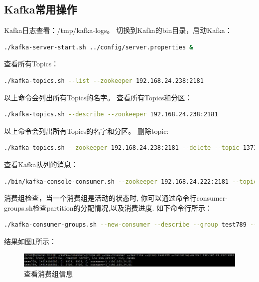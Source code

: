 \documentclass{book}
\begin{document}
\subsection{Kafka常用操作}

Kafka日志查看：/tmp/kafka-logs。
切换到Kafka的bin目录，启动Kafka：

\begin{lstlisting}[language=Bash]
./kafka-server-start.sh ../config/server.properties &
\end{lstlisting}

查看所有Topics：

\begin{lstlisting}[language=Bash]
./kafka-topics.sh --list --zookeeper 192.168.24.238:2181
\end{lstlisting}

以上命令会列出所有Topics的名字。
查看所有Topics和分区：

\begin{lstlisting}[language=Bash]
./kafka-topics.sh --describe --zookeeper 192.168.24.238:2181
\end{lstlisting}

以上命令会列出所有Topics的名字和分区。
删除topic:

\begin{lstlisting}[language=Bash]
./kafka-topics.sh --zookeeper 192.168.24.238:2181 --delete --topic 13714988574
\end{lstlisting}

查看Kafka队列的消息：

\begin{lstlisting}[language=Bash]
./bin/kafka-console-consumer.sh --zookeeper 192.168.24.222:2181 --topic 14914186882 --from-beginning
\end{lstlisting}

消费组检查，当一个消费组是活动的状态时,
你可以通过命令行consumer-groups.sh检查partition的分配情况,以及消费进度.
如下命令行所示：

\begin{lstlisting}[language=Bash]
./kafka-consumer-groups.sh --new-consumer --describe --group test789 --bootstrap-server 192.168.24.222:9092
\end{lstlisting}

结果如图\ref{code:CheckKafkaComsumerGroup}所示：

\begin{figure}[htbp]
	\centering
	\includegraphics[scale=0.5]{CheckKafkaComsumerGroup.jpg}
	\caption{查看消费组信息}
	\label{code:CheckKafkaComsumerGroup}
\end{figure}
\end{document}
